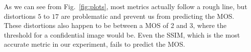 \documentclass{article}
\begin{document}


As we can see from Fig.~\ref{fig:plots}, most metrics actually follow a rough line, but distortions $5$ to $17$ are problematic and prevent us from predicting the MOS. These distortions also happen to be between a MOS of 2 and 3, where the threshold for a confidential image would be. Even the SSIM, which is the most accurate metric in our experiment, fails to predict the MOS.%
\end{document}
